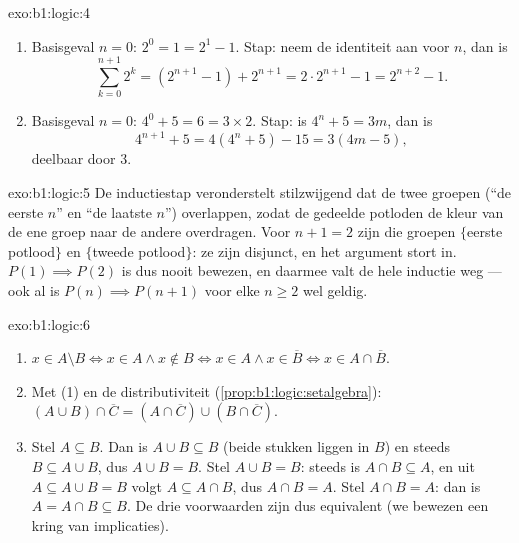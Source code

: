\begin{solution}{exo:b1:logic:4}
\begin{enumerate}
  \item Basisgeval $n = 0$: $2^0 = 1 = 2^1 - 1$. Stap: neem de
        identiteit aan voor $n$, dan is
        \[
        \sum_{k=0}^{n+1} 2^k = (2^{n+1} - 1) + 2^{n+1}
        = 2 \cdot 2^{n+1} - 1 = 2^{n+2} - 1 .
        \]
  \item Basisgeval $n = 0$: $4^0 + 5 = 6 = 3 \times 2$. Stap: is
        $4^n + 5 = 3m$, dan is
        \[
        4^{n+1} + 5 = 4(4^n + 5) - 15 = 3(4m - 5),
        \]
        deelbaar door $3$.
\end{enumerate}
\end{solution}

\begin{solution}{exo:b1:logic:5}
De inductiestap veronderstelt stilzwijgend dat de twee groepen (``de
eerste $n$'' en ``de laatste $n$'') overlappen, zodat de gedeelde
potloden de kleur van de ene groep naar de andere overdragen. Voor
$n + 1 = 2$ zijn die groepen $\{$eerste potlood$\}$ en $\{$tweede
potlood$\}$: ze zijn disjunct, en het argument stort in. $P(1) \implies
P(2)$ is dus nooit bewezen, en daarmee valt de hele inductie weg --- ook
al is $P(n) \implies P(n+1)$ voor elke $n \geq 2$ wel geldig.
\end{solution}

\begin{solution}{exo:b1:logic:6}
\begin{enumerate}
  \item $x \in A \setminus B \iff x \in A \land x \notin B \iff x \in
        A \land x \in \overline{B} \iff x \in A \cap \overline{B}$.
  \item Met (1) en de distributiviteit
        (\cref{prop:b1:logic:setalgebra}):
        $(A \cup B) \cap \overline{C} = (A \cap \overline{C}) \cup
        (B \cap \overline{C})$.
  \item Stel $A \subseteq B$. Dan is $A \cup B \subseteq B$ (beide
        stukken liggen in $B$) en steeds $B \subseteq A \cup B$, dus
        $A \cup B = B$. Stel $A \cup B = B$: steeds is $A \cap B
        \subseteq A$, en uit $A \subseteq A \cup B = B$ volgt
        $A \subseteq A \cap B$, dus $A \cap B = A$. Stel $A \cap B =
        A$: dan is $A = A \cap B \subseteq B$. De drie voorwaarden zijn
        dus equivalent (we bewezen een kring van implicaties).
\end{enumerate}
\end{solution}


